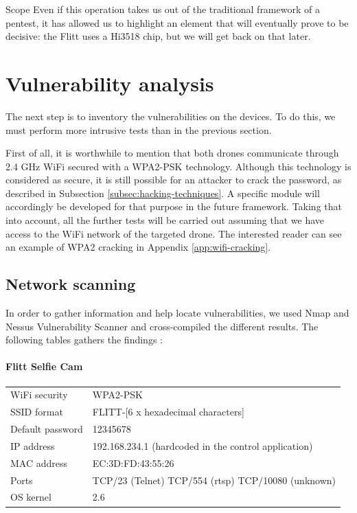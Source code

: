\begin{chaptercover}{Scope}
Even if this operation takes us out of the traditional framework of a pentest, it has allowed us to highlight an element that will eventually prove to be decisive: the Flitt uses a Hi3518 chip, but we will get back on that later.

\section{Vulnerability analysis}

The next step is to inventory the vulnerabilities on the devices. To do this, we must perform more intrusive tests than in the previous section.

\begin{tip}
First of all, it is worthwhile to mention that both drones communicate through 2.4 GHz WiFi secured with a WPA2-PSK technology. Although this technology is considered as secure, it is still possible for an attacker to crack the password, as described in Subsection \ref{subsec:hacking-techniques}. A specific module will accordingly be developed for that purpose in the future framework. Taking that into account, all the further tests will be carried out assuming that we have access to the WiFi network of the targeted drone. The interested reader can see an example of WPA2 cracking in Appendix \ref{app:wifi-cracking}.
\end{tip}

\subsection{Network scanning}

In order to gather information and help locate vulnerabilities, we used Nmap and Nessus Vulnerability Scanner and cross-compiled the different results. The following tables gathers the findings :

\paragraph{Flitt Selfie Cam}

\begingroup
\renewcommand*{\arraystretch}{1.3}
\begin{center}
\begin{tabular}{L{4cm}L{10cm}}
  WiFi security & WPA2-PSK \\
  SSID format & FLITT-[6 x hexadecimal characters] \\
  Default password & 12345678 \\
  IP address & 192.168.234.1 (hardcoded in the control application) \\
  MAC address & EC:3D:FD:43:55:26 \\
  Ports & TCP/23 (Telnet) \newline TCP/554 (\acrshort{rtsp}) \newline TCP/10080 (unknown) \\
  OS kernel & 2.6 \\
\end{tabular}
\end{center}
\endgroup


\end{chaptercover}
